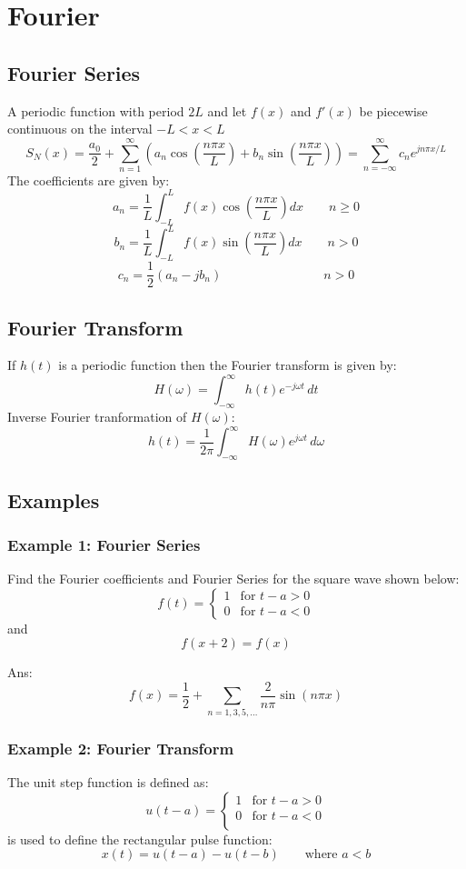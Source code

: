 \section{Fourier}
\subsection{Fourier Series}
A periodic function with period $2L$ and let $f(x)$ and $f'(x)$ be piecewise continuous on the interval $-L < x < L$
$$S_{N}(x)=\frac{a_{0}}{2}+\sum_{n=1}^{\infty}\left( a_{n}\cos\left( \frac{n\pi x}{L} \right)+b_{n}\sin\left( \frac{n\pi x}{L} \right) \right)=\sum^{\infty}_{n=-\infty}c_{n}e^{ jn\pi x/L }$$
The coefficients are given by:
$$a_n  =\frac{1}{L} \int_{-L}^L f(x) \cos \left(\frac{n \pi x}{L}\right) d x\qquad   n \geq 0$$
$$b_n  =\frac{1}{L} \int_{-L}^L f(x) \sin \left(\frac{n \pi x}{L}\right) d x\qquad   n>0$$
$$c_{n}=\frac{1}{2}(a_{n}-jb_{n})\qquad \qquad \qquad\qquad n>0$$

\subsection{Fourier Transform}
If $h(t)$ is a periodic function then the Fourier transform is given by:
$$H(\omega)=\int_{-\infty}^{\infty}h(t)e^{ -j\omega t }  \, dt $$
Inverse Fourier tranformation of $H(\omega)$:
$$h(t)=\frac{1}{2\pi}\int_{-\infty}^{\infty} H(\omega)e^{ j\omega t } \, d\omega $$

\subsection{Examples}
\subsubsection{Example 1: Fourier Series}
Find the Fourier coefficients and Fourier Series for the square wave shown below:
$$f(t)=\begin{cases}
  1 &  \text{for }t-a>0\\
  0 & \text{for }t-a<0
\end{cases}$$
and
$$f(x+2)=f(x)$$


Ans:
$$f(x)=\frac{1}{2}+\sum_{n=1,3,5,\dots}\frac{2}{n\pi}\sin(n\pi x)$$
\subsubsection{Example 2: Fourier Transform}
The unit step function is defined as:
$$u(t-a)=\begin{cases}
  1&  \text{for }t-a>0\\
  0&  \text{for }t-a<0\\
\end{cases}$$
is used to define the rectangular pulse function:
$$x(t)=u(t-a)-u(t-b)\qquad \text{where }a<b$$

